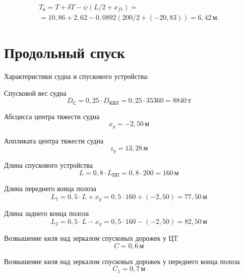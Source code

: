 \begin{equation*}
    \begin{split}
        T_{\text{к}} = T + \delta T - \psi (L/2 + x_{f1}) = \\
        = 10{,}86 + 2{,}62 - 0{,}0892 ( 200/2 + (-20{,}83)) = 6{,}42\,\text{м}.
    \end{split}
\end{equation*}

\section{Продольный спуск}

Характеристики судна и спускового устройства:

Спусковой вес судна
\begin{equation*}
    D_{\text{С}} = 0{,}25 \cdot D_{\text{КВЛ}} = 0{,}25 \cdot 35360 = 8840\,\text{т}
\end{equation*}

Абсцисса центра тяжести судна
\begin{equation*}
    x_g = -2{,}50\,\text{м}
\end{equation*}

Аппликата центра тяжести судна
\begin{equation*}
    z_g = 13{,}28\,\text{м}
\end{equation*}

Длина спускового устройства
\begin{equation*}
    L = 0{,}8 \cdot L_{\text{ПП}} = 0{,}8 \cdot 200 = 160\,\text{м}
\end{equation*}

Длина переднего конца полоза
\begin{equation*}
    L_1 = 0{,}5 \cdot L + x_g = 0{,}5 \cdot 160 + (-2{,}50) = 77{,}50\,\text{м}
\end{equation*}

Длина заднего конца полоза
\begin{equation*}
    L_2 = 0{,}5 \cdot L - x_g = 0{,}5 \cdot 160 - (-2{,}50) = 82{,}50\,\text{м}
\end{equation*}

Возвышение киля над зеркалом спусковых дорожек у ЦТ
\begin{equation*}
    C = 0{,}6\,\text{м}
\end{equation*}

Возвышение киля над зеркалом спусковых дорожек у переднего конца полоза
\begin{equation*}
    C_1 = 0{,}7\,\text{м}
\end{equation*}

